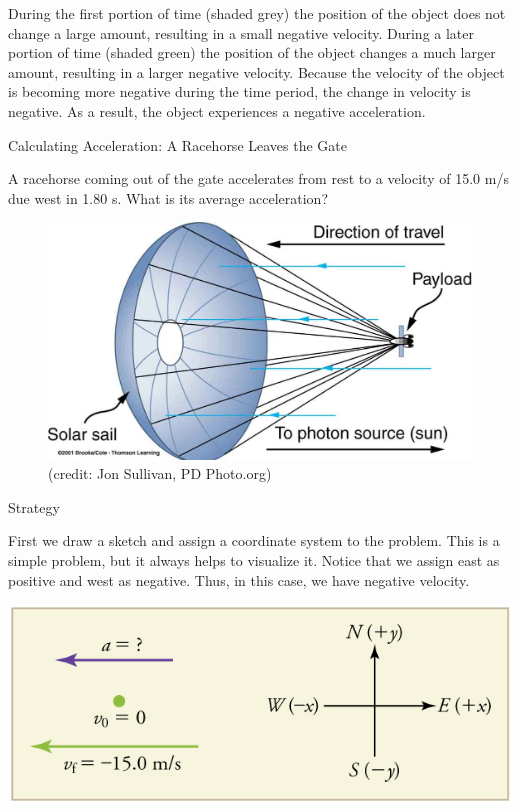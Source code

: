 \documentclass[
]{book}
\begin{document}
During the first portion of time (shaded grey) the position of the
object does not change a large amount, resulting in a small negative
velocity. During a later portion of time (shaded green) the position of
the object changes a much larger amount, resulting in a larger negative
velocity. Because the velocity of the object is becoming more negative
during the time period, the change in velocity is negative. As a result,
the object experiences a negative acceleration.

\hypertarget{fs-id2013623}{}
Calculating Acceleration: A Racehorse Leaves the Gate

A racehorse coming out of the gate accelerates from rest to a velocity
of 15.0 m/s due west in 1.80 s. What is its average acceleration?

\begin{figure}
\hypertarget{import-auto-id1806246}{%
\centering
\includegraphics{images/graphics4.jpg}
\caption{(credit: Jon Sullivan, PD
Photo.org)}\label{import-auto-id1806246}
}
\end{figure}

{Strategy}

First we draw a sketch and assign a coordinate system to the problem.
This is a simple problem, but it always helps to visualize it. Notice
that we assign east as positive and west as negative. Thus, in this
case, we have negative velocity.

\includegraphics{images/Figure_02_03_01a.jpg}
\end{document}

